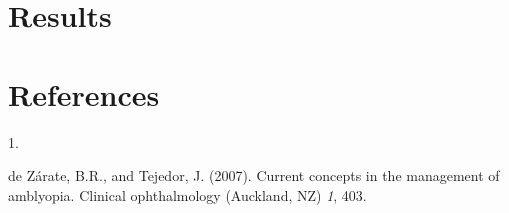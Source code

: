 \documentclass[
]{article}
\newlength{\cslhangindent}
\newlength{\csllabelwidth}
\newenvironment{CSLReferences}[2] %
 {\begin{list}{}{%
  \setlength{\itemindent}{0pt}
  \setlength{\leftmargin}{0pt}
  \setlength{\parsep}{0pt}
  \ifodd #1
   \setlength{\leftmargin}{\cslhangindent}
   \setlength{\itemindent}{-1\cslhangindent}
  \fi
  \setlength{\itemsep}{#2\baselineskip}}}
 {\end{list}}
\newcommand{\CSLLeftMargin}[1]{\parbox[t]{\csllabelwidth}{\strut#1\strut}}
\newcommand{\CSLRightInline}[1]{\parbox[t]{\linewidth - \csllabelwidth}{\strut#1\strut}}
\begin{document}
\section{Results}\label{sec:results}

\section{References}\label{sec:references}

\protect{}\label{refs}
\begin{CSLReferences}{0}{1}
\CSLLeftMargin{1. }%
\CSLRightInline{de Zárate, B.R., and Tejedor, J. (2007). Current
concepts in the management of amblyopia. Clinical ophthalmology
(Auckland, NZ) \emph{1}, 403.}

\end{CSLReferences}
\end{document}
